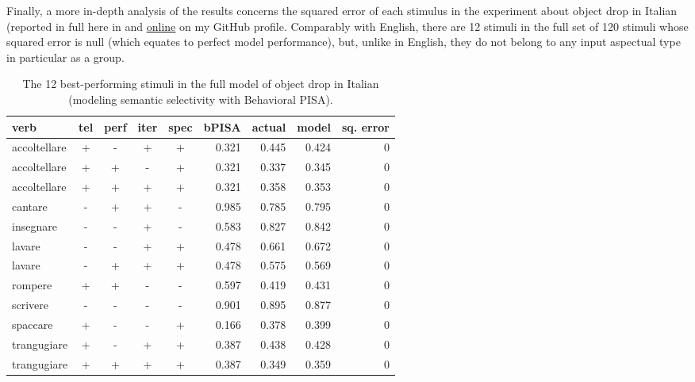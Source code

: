 Finally, a more in-depth analysis of the results concerns the squared error of each stimulus in the experiment about object drop in Italian (reported in full here in  and \href{https://github.com/giuliacappelli/dissertationData}{online} on my GitHub profile. Comparably with English, there are 12 stimuli in the full set of 120 stimuli whose squared error is null (which equates to perfect model performance), but, unlike in English, they do not belong to any input aspectual type in particular as a group. %

\begin{table}[htb] %
\caption{The 12 best-performing stimuli in the full model of object drop in Italian (modeling semantic selectivity with Behavioral PISA).}
\begin{tabular}{l|ccccr|rrr}
\textbf{verb}  & \textbf{tel} & \textbf{perf} & \textbf{iter} & \textbf{spec} & \textbf{bPISA}   & \textbf{actual} & \textbf{model} & \textbf{sq. error} \\
\hline
accoltellare & +  & -   & +   & +     & 0.321 & 0.445  & 0.424     & 0             \\
accoltellare & +  & +   & -   & +     & 0.321 & 0.337  & 0.345     & 0             \\
accoltellare & +  & +   & +   & +     & 0.321 & 0.358  & 0.353     & 0             \\
cantare      & -  & +   & +   & -     & 0.985 & 0.785  & 0.795     & 0             \\
insegnare    & -  & -   & +   & -     & 0.583 & 0.827  & 0.842     & 0             \\
lavare       & -  & -   & +   & +     & 0.478 & 0.661  & 0.672     & 0             \\
lavare       & -  & +   & +   & +     & 0.478 & 0.575  & 0.569     & 0             \\
rompere      & +  & +   & -   & -     & 0.597 & 0.419  & 0.431     & 0             \\
scrivere     & -  & -   & -   & -     & 0.901 & 0.895  & 0.877     & 0             \\
spaccare     & +  & -   & -   & +     & 0.166 & 0.378  & 0.399     & 0             \\
trangugiare  & +  & -   & +   & +     & 0.387 & 0.438  & 0.428     & 0             \\
trangugiare  & +  & +   & +   & +     & 0.387 & 0.349  & 0.359     & 0            
\end{tabular}
\end{table}

